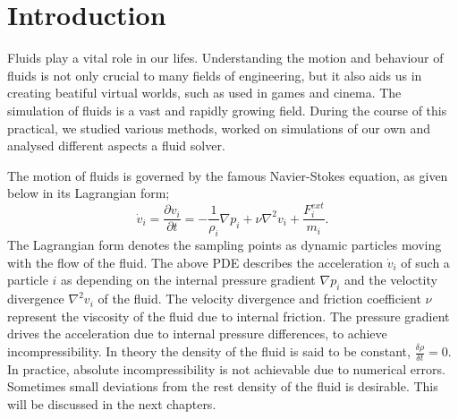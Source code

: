 \documentclass[11pt, letterpaper, twocolumn]{article}
\begin{document}




\section{Introduction} \label{sec:introduction}

Fluids play a vital role in our lifes. Understanding the motion and behaviour of fluids is not only crucial to many fields of engineering, but it also aids us in creating beatiful virtual worlds, such as used in games and cinema. The simulation of fluids is a vast and rapidly growing field. During the course of this practical, we studied various methods, worked on simulations of our own and analysed different aspects a fluid solver.  

The motion of fluids is governed by the famous Navier-Stokes equation, as given below in its Lagrangian form;
\begin{equation}
  \dot{v}_i = \frac{\partial v_i}{\partial t} = -\frac{1}{\rho_i}\nabla p_i +\nu \nabla^2 v_i + \frac{F^{ext}_i}{m_i}.
\end{equation}
The Lagrangian form denotes the sampling points as dynamic particles moving with the flow of the fluid. The above PDE describes the acceleration \( \dot{v}_i\) of such a particle \( i \) as depending on the internal pressure gradient \( \nabla p_i\) and the veloctity divergence \( \nabla^2 v_i\) of the fluid. The velocity divergence and friction coefficient \( \nu \) represent the viscosity of the fluid due to internal friction. The pressure gradient drives the acceleration due to internal pressure differences, to achieve incompressibility. In theory the density of the fluid is said to be constant, 
\(\frac{\delta \rho}{\delta t} = 0.\)
In practice, absolute incompressibility is not achievable due to numerical errors. Sometimes small deviations from the rest density of the fluid is desirable. This will be discussed in the next chapters. \cite{bender2015, ihmsen2014}
\end{document}
